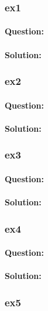 \documentclass[a4paper,12pt,titlepage]{article} %
\begin{document}
\subsubsection{ex1}
\paragraph{Question:}

\paragraph{Solution:}

\subsubsection{ex2}
\paragraph{Question:}

\paragraph{Solution:}

\subsubsection{ex3}
\paragraph{Question:}

\paragraph{Solution:}

\subsubsection{ex4}
\paragraph{Question:}

\paragraph{Solution:}

\subsubsection{ex5}
\end{document}
